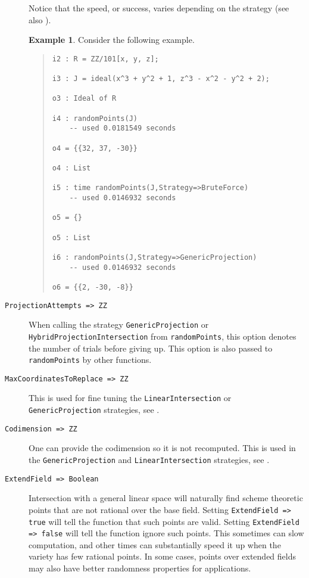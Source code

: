 \documentclass[11pt]{amsart}
\theoremstyle{definition}
\newtheorem{example}{Example}[section]
\begin{document}
\begin{description}
    Notice that the speed, or success, varies depending on the strategy (see also ).

    \begin{example}\label{BruteForce}
        Consider the following example.
        ~~        
        {\small\color{blue}
    \begin{quote}
\begin{verbatim}
i2 : R = ZZ/101[x, y, z];

i3 : J = ideal(x^3 + y^2 + 1, z^3 - x^2 - y^2 + 2);

o3 : Ideal of R

i4 : randomPoints(J)
    -- used 0.0181549 seconds
    
o4 = {{32, 37, -30}}

o4 : List

i5 : time randomPoints(J,Strategy=>BruteForce)
    -- used 0.0146932 seconds
    
o5 = {}

o5 : List

i6 : randomPoints(J,Strategy=>GenericProjection)
    -- used 0.0146932 seconds
    
o6 = {{2, -30, -8}}
        \end{verbatim}
    \end{quote}
        }
    \end{example}%
    \vspace{-1em}
    \item[\tt ProjectionAttempts => ZZ] 

    When calling the strategy {\tt GenericProjection} or \\
    {\tt HybridProjectionIntersection} from {\tt randomPoints}, this option denotes the number of trials before giving up.  This option is also passed to {\tt randomPoints} by other functions.

    \item[\tt MaxCoordinatesToReplace => ZZ] This is used for fine tuning the {\tt LinearIntersection} or {\tt GenericProjection} strategies, see .
    \item[\tt Codimension => ZZ] One can provide the codimension so it is not recomputed.  This is used in the {\tt GenericProjection} and {\tt LinearIntersection} strategies, see . 

    \item[\tt ExtendField => Boolean] 

    Intersection with a general linear space will naturally find scheme theoretic points that are not rational over the base field.  
    Setting {\tt ExtendField => true} will tell the function that such points are valid.  Setting {\tt ExtendField => false} will tell the function ignore such points.  This sometimes can slow computation, and other times can substantially speed it up when the variety has few rational points.  In some cases, points over extended fields may also have better randomness properties for applications.



\end{description}
\end{document}

